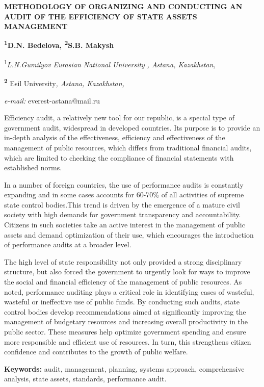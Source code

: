 {\bfseries METHODOLOGY OF ORGANIZING AND CONDUCTING AN AUDIT OF THE
EFFICIENCY OF STATE ASSETS MANAGEMENT}

{\bfseries \textsuperscript{1}D.N. Bedelova\textsuperscript{\envelope },
\textsuperscript{2}S.B. Makysh}

\textsuperscript{1}\emph{L.N.Gumilyov} \emph{Eurasian National
University} \emph{, Astana, Kazakhstan,}

{\bfseries \textsuperscript{2}} Esil University\emph{, Astana, Kazakhstan,}

\emph{e-mail:} everest-astana@mail.ru

Efficiency audit, a relatively new tool for our republic, is a special
type of government audit, widespread in developed countries. Its purpose
is to provide an in-depth analysis of the effectiveness, efficiency and
effectiveness of the management of public resources, which differs from
traditional financial audits, which are limited to checking the
compliance of financial statements with established norms.

In a number of foreign countries, the use of performance audits is
constantly expanding and in some cases accounts for 60-70\% of all
activities of supreme state control bodies.This trend is driven by the
emergence of a mature civil society with high demands for government
transparency and accountability. Citizens in such societies take an
active interest in the management of public assets and demand
optimization of their use, which encourages the introduction of
performance audits at a broader level.

The high level of state responsibility not only provided a strong
disciplinary structure, but also forced the government to urgently look
for ways to improve the social and financial efficiency of the
management of public resources. As noted, performance auditing plays a
critical role in identifying cases of wasteful, wasteful or ineffective
use of public funds. By conducting such audits, state control bodies
develop recommendations aimed at significantly improving the management
of budgetary resources and increasing overall productivity in the public
sector. These measures help optimize government spending and ensure more
responsible and efficient use of resources. In turn, this strengthens
citizen confidence and contributes to the growth of public welfare.

{\bfseries Keywords:} audit, management, planning, systems approach,
comprehensive analysis, state assets, standards, performance audit.

